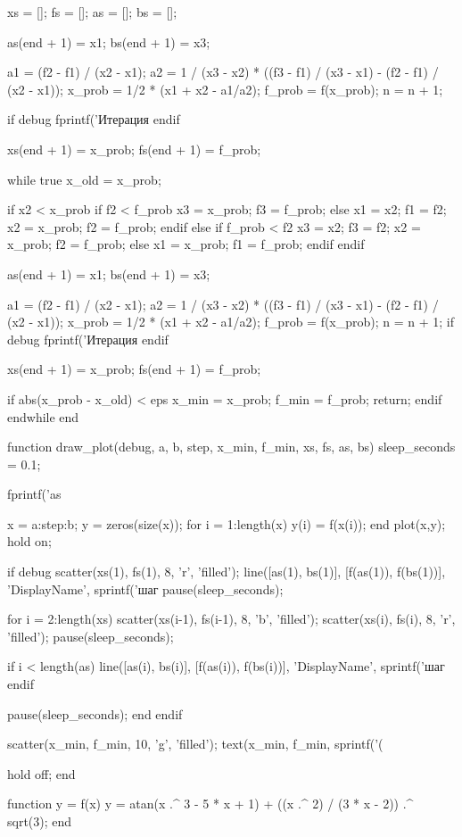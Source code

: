   xs = [];
  fs = [];
  as = [];
  bs = [];

  as(end + 1) = x1;
  bs(end + 1) = x3;

  a1 = (f2 - f1) / (x2 - x1);
  a2 = 1 / (x3 - x2) * ((f3 - f1) / (x3 - x1) - (f2 - f1) / (x2 - x1));
  x_prob = 1/2 * (x1 + x2 - a1/a2);
  f_prob = f(x_prob);
  n = n + 1;

  if debug
    fprintf('Итерация %
  endif

  xs(end + 1) = x_prob;
  fs(end + 1) = f_prob;

  while true
    x_old = x_prob;

    if x2 < x_prob
      if f2 < f_prob
        x3 = x_prob;
        f3 = f_prob;
      else
        x1 = x2;
        f1 = f2;
        x2 = x_prob;
        f2 = f_prob;
      endif
    else
      if f_prob < f2
        x3 = x2;
        f3 = f2;
        x2 = x_prob;
        f2 = f_prob;
      else
        x1 = x_prob;
        f1 = f_prob;
      endif
    endif

    as(end + 1) = x1;
    bs(end + 1) = x3;

    a1 = (f2 - f1) / (x2 - x1);
    a2 = 1 / (x3 - x2) * ((f3 - f1) / (x3 - x1) - (f2 - f1) / (x2 - x1));
    x_prob = 1/2 * (x1 + x2 - a1/a2);
    f_prob = f(x_prob);
    n = n + 1;
    if debug
      fprintf('Итерация %
    endif

    xs(end + 1) = x_prob;
    fs(end + 1) = f_prob;

    if abs(x_prob - x_old) < eps
      x_min = x_prob;
      f_min = f_prob;
      return;
    endif
  endwhile
end

function draw_plot(debug, a, b, step, x_min, f_min, xs, fs, as, bs)
  sleep_seconds = 0.1;

  fprintf('as %

  x = a:step:b;
  y = zeros(size(x));
  for i = 1:length(x)
      y(i) = f(x(i));
  end
  plot(x,y);
  hold on;

  if debug
    scatter(xs(1), fs(1), 8, 'r', 'filled');
    line([as(1), bs(1)], [f(as(1)), f(bs(1))], 'DisplayName', sprintf('шаг %
    pause(sleep_seconds);

    for i = 2:length(xs)
        scatter(xs(i-1), fs(i-1), 8, 'b', 'filled');
        scatter(xs(i), fs(i), 8, 'r', 'filled');
        pause(sleep_seconds);

        if i < length(as)
          line([as(i), bs(i)], [f(as(i)), f(bs(i))], 'DisplayName', sprintf('шаг %
        endif

        pause(sleep_seconds);
    end
  endif

  scatter(x_min, f_min, 10, 'g', 'filled');
  text(x_min, f_min, sprintf('\n\n\n\n(%

  hold off;
end

function y = f(x)
  y = atan(x .^ 3 - 5 * x + 1) + ((x .^ 2) / (3 * x - 2)) .^ sqrt(3);
end